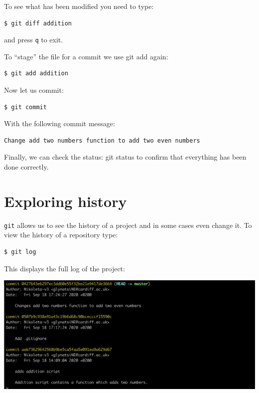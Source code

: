\documentclass[11pt]{article}
\begin{document}
    To see what has been modified you need to type:

\begin{verbatim}
$ git diff addition
\end{verbatim}

and press \texttt{q} to exit.

To ``stage'' the file for a commit we use git add again:

\begin{verbatim}
$ git add addition
\end{verbatim}

Now let us commit:

\begin{verbatim}
$ git commit
\end{verbatim}

With the following commit message:

\begin{verbatim}
Change add two numbers function to add two even numbers
\end{verbatim}

Finally, we can check the status: git status to confirm that everything
has been done correctly.

    \hypertarget{exploring-history}{%
\section{Exploring history}\label{exploring-history}}

    \texttt{git} allows us to see the history of a project and in some cases
even change it. To view the history of a repository type:

\begin{verbatim}
$ git log
\end{verbatim}

This displays the full log of the project:

\includegraphics{static/git_log.png}
\end{document}
